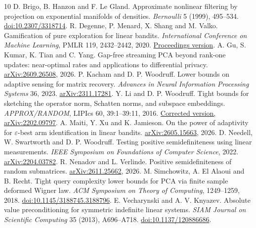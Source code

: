 \begin{thebibliography}{10}\small
{} D. Brigo, B. Hanzon and F. Le Gland.
Approximate nonlinear filtering by projection on exponential manifolds of densities.
\emph{Bernoulli} 5 (1999), 495--534. \href{https://doi.org/10.2307/3318714}{doi:10.2307/3318714}.
 R. Degenne, P. Menard, X. Shang and M. Valko.
Gamification of pure exploration for linear bandits.
\emph{International Conference on Machine Learning}, PMLR 119, 2432--2442, 2020.
\href{https://proceedings.mlr.press/v119/degenne20a.html}{Proceedings version}.
 A. Gu, S. Kumar, K. Tian and C. Yang.
Gap-free streaming PCA beyond rank-one updates: near-optimal rates and applications to differential privacy.
\href{https://arxiv.org/abs/2609.26508}{arXiv:2609.26508}, 2026.
 P. Kacham and D. P. Woodruff.
Lower bounds on adaptive sensing for matrix recovery.
\emph{Advances in Neural Information Processing Systems} 36, 2023.
\href{https://arxiv.org/abs/2311.17281}{arXiv:2311.17281}.
 Y. Li and D. P. Woodruff.
Tight bounds for sketching the operator norm, Schatten norms, and subspace embeddings.
\emph{APPROX/RANDOM}, LIPIcs 60, 39:1--39:11, 2016.
\href{https://arxiv.org/abs/2202.09797}{Corrected version, arXiv:2202.09797}.
 A. Maiti, Y. Xu and K. Jamieson.
On the power of adaptivity for \(\varepsilon\)-best arm identification in linear bandits.
\href{https://arxiv.org/abs/2605.15663}{arXiv:2605.15663}, 2026.
 D. Needell, W. Swartworth and D. P. Woodruff.
Testing positive semidefiniteness using linear measurements.
\emph{IEEE Symposium on Foundations of Computer Science}, 2022.
\href{https://arxiv.org/abs/2204.03782}{arXiv:2204.03782}.
 R. Nenadov and L. Verlinde.
Positive semidefiniteness of random submatrices.
\href{https://arxiv.org/abs/2611.25662}{arXiv:2611.25662}, 2026.
 M. Simchowitz, A. El Alaoui and B. Recht.
Tight query complexity lower bounds for PCA via finite sample deformed Wigner law.
\emph{ACM Symposium on Theory of Computing}, 1249--1259, 2018.
\href{https://doi.org/10.1145/3188745.3188796}{doi:10.1145/3188745.3188796}.
 E. Vecharynski and A. V. Knyazev.
Absolute value preconditioning for symmetric indefinite linear systems.
\emph{SIAM Journal on Scientific Computing} 35 (2013), A696--A718.
\href{https://doi.org/10.1137/120886686}{doi:10.1137/120886686}.
\end{thebibliography}
